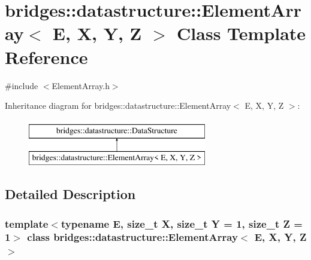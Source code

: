\hypertarget{classbridges_1_1datastructure_1_1_element_array}{}\section{bridges\+:\+:datastructure\+:\+:Element\+Array$<$ E, X, Y, Z $>$ Class Template Reference}
\label{classbridges_1_1datastructure_1_1_element_array}


{\ttfamily \#include $<$Element\+Array.\+h$>$}

Inheritance diagram for bridges\+:\+:datastructure\+:\+:Element\+Array$<$ E, X, Y, Z $>$\+:\begin{figure}[H]
\begin{center}
\leavevmode
\includegraphics[height=2.000000cm]{classbridges_1_1datastructure_1_1_element_array}
\end{center}
\end{figure}


\subsection{Detailed Description}
\subsubsection*{template$<$typename E, size\+\_\+t X, size\+\_\+t Y = 1, size\+\_\+t Z = 1$>$\newline
class bridges\+::datastructure\+::\+Element\+Array$<$ E, X, Y, Z $>$}

